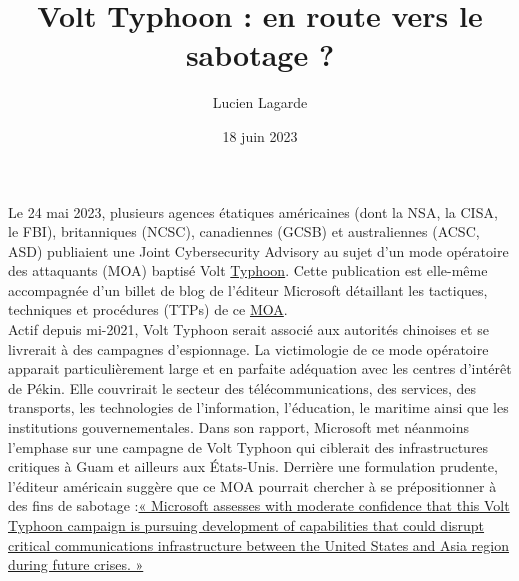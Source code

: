 \documentclass[a4paper]{article}
\title{Volt Typhoon : en route vers le sabotage ?}
\author{Lucien Lagarde} %
\date{18 juin 2023}
\begin{document}
\maketitle                 

Le 24 mai 2023, plusieurs agences étatiques américaines (dont la NSA, la CISA, le FBI), britanniques (NCSC), canadiennes (GCSB) et australiennes (ACSC, ASD) publiaient une Joint Cybersecurity Advisory au sujet d’un mode opératoire des attaquants (MOA) baptisé Volt \href{https://www.nytimes.com/2023/05/24/us/politics/china-guam-malware-cyber-microsoft.html}{Typhoon}. Cette publication est elle-même accompagnée d’un billet de blog de l’éditeur Microsoft détaillant les tactiques, techniques et procédures (TTPs) de ce \href{https://www.microsoft.com/en-us/security/blog/2023/05/24/volt-typhoon-targets-us-critical-infrastructure-with-living-off-the-land-techniques/}
{MOA}.
\\

Actif depuis mi-2021, Volt Typhoon serait associé aux autorités chinoises et se livrerait à des campagnes d’espionnage. La victimologie de ce mode opératoire apparait particulièrement large et en parfaite adéquation avec les centres d’intérêt de Pékin. Elle couvrirait le secteur des télécommunications, des services, des transports, les technologies de l’information, l’éducation, le maritime ainsi que les institutions gouvernementales. Dans son rapport, Microsoft met néanmoins l’emphase sur une campagne de Volt Typhoon qui ciblerait des infrastructures critiques à Guam et ailleurs aux États-Unis. Derrière une formulation prudente, l’éditeur américain suggère que ce MOA pourrait chercher à se prépositionner à des fins de sabotage :\href{https://www.cert.ssi.gouv.fr/cti/CERTFR-2021-CTI-012/}
{« Microsoft assesses with moderate confidence that this Volt Typhoon campaign is pursuing development of capabilities that could disrupt critical communications infrastructure between the United States and Asia region during future crises. »}
\\
\end{document}
